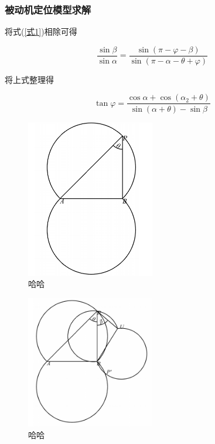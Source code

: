 \documentclass[withoutpreface,bwprint]{cumcmthesis} %
\begin{document}
\subsubsection{被动机定位模型求解}

将式(\ref{式1})相除可得

\begin{equation}
    \frac{\sin\beta}{\sin\alpha} = \frac{\sin(\pi - \varphi -\beta)}{\sin(\pi - \alpha - \theta + \varphi)}
\end{equation}

将上式整理得

\begin{equation}
    \tan\varphi= \frac{\cos\alpha + \cos(\alpha_2 +\theta)}{\sin(\alpha+\theta)- \sin\beta}
\end{equation}








\begin{figure}[htbp]
    \centering
    \includegraphics[width=0.5\textwidth]{../../figure/q1_3.png} 
    \caption{哈哈}  
    \label{q1_4}    
\end{figure}

\begin{figure}[htbp]
    \centering
    \includegraphics[width=0.5\textwidth]{../../figure/q1_4.png} 
    \caption{哈哈}
    \label{q1_3}   
\end{figure}
\end{document}
